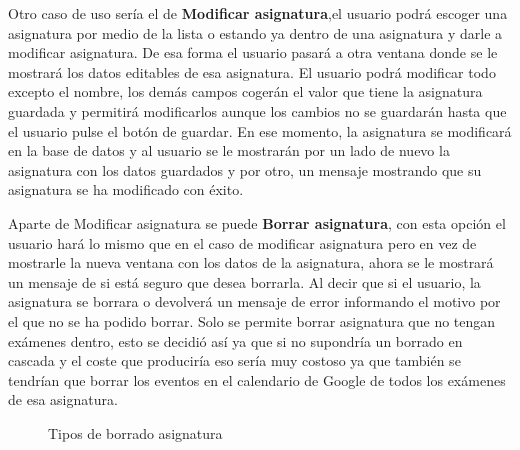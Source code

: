 Otro caso de uso sería el de \textbf{Modificar asignatura},el usuario podrá escoger una asignatura por medio de la lista o estando ya dentro de una asignatura y darle a modificar asignatura. De esa forma el usuario pasará a otra ventana donde se le mostrará los datos editables de esa asignatura.
El usuario podrá modificar todo excepto el nombre, los demás campos cogerán el valor que tiene la asignatura guardada y permitirá modificarlos aunque los  cambios no se guardarán hasta que el usuario pulse el botón de guardar.
En ese momento, la asignatura se modificará en la base de datos y al usuario se le mostrarán por un lado de nuevo la asignatura con los datos guardados y por otro, un mensaje mostrando que su asignatura se ha modificado con éxito.


Aparte de Modificar asignatura se puede \textbf{Borrar asignatura}, con esta opción el usuario hará lo mismo que en el caso de modificar asignatura pero en vez de mostrarle la nueva ventana con los datos de la asignatura, ahora se le mostrará un mensaje de si está seguro que desea borrarla.
Al decir que si el usuario, la asignatura se borrara o devolverá un mensaje de error informando el motivo por el que no se ha podido borrar.
Solo se permite borrar asignatura que no tengan exámenes dentro, esto se decidió así ya que si no supondría un borrado en cascada y el coste que produciría eso sería muy costoso ya que también se tendrían que borrar los eventos en el calendario de Google de todos los exámenes de esa asignatura.


\begin{figure}[H]
 \centering
 \caption{Tipos de borrado asignatura}
 \label{f:Tipos de borrado asignatura}
\end{figure}

